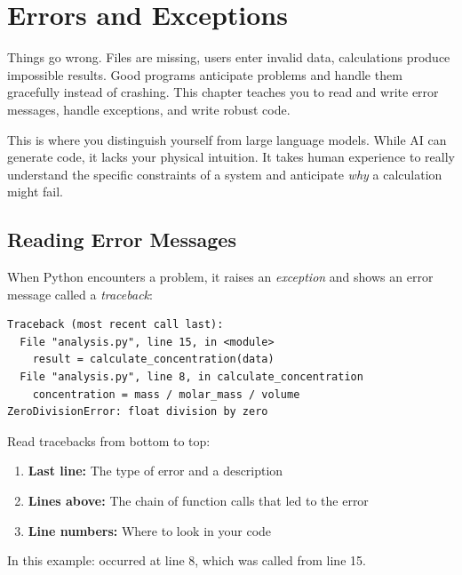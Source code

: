
\chapter{Errors and Exceptions}
\label{chap:errors}

Things go wrong. Files are missing, users enter invalid data, calculations produce impossible results. Good programs anticipate problems and handle them gracefully instead of crashing. This chapter teaches you to read and write error messages, handle exceptions, and write robust code. 

This is where you distinguish yourself from large language models. While AI can generate code, it lacks your physical intuition. It takes human experience to really understand the specific constraints of a system and anticipate \emph{why} a calculation might fail.

\section{Reading Error Messages}
\label{sec:reading-errors}

When Python encounters a problem, it raises an \emph{exception} and shows an error message called a \emph{traceback}:

\begin{lstlisting}[style=outputstyle]
Traceback (most recent call last):
  File "analysis.py", line 15, in <module>
    result = calculate_concentration(data)
  File "analysis.py", line 8, in calculate_concentration
    concentration = mass / molar_mass / volume
ZeroDivisionError: float division by zero
\end{lstlisting}

Read tracebacks from bottom to top:
\begin{enumerate}
    \item \textbf{Last line:} The type of error and a description
    \item \textbf{Lines above:} The chain of function calls that led to the error
    \item \textbf{Line numbers:} Where to look in your code
\end{enumerate}

In this example:  occurred at line 8, which was called from line 15.


